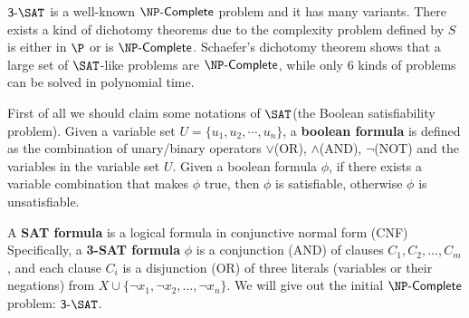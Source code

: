 
$\sat{3}$ is a well-known $\complete{\NP}$ problem and it has many variants. There exists a kind of dichotomy theorems due to the complexity problem defined by $S$ is either in $\P$ or is $\complete{\NP}$. Schaefer's dichotomy theorem shows that a large set of $\SAT$-like problems are $\complete{\NP}$, while only $6$ kinds of problems can be solved in polynomial time.

First of all we should claim some notations of $\SAT$(the Boolean satisfiability problem). Given a variable set $U = \{u_1,u_2,\cdots,u_n\}$, a \textbf{boolean formula} is defined as the combination of unary/binary operators $\vee$(OR), $\wedge$(AND), $\neg$(NOT) and the variables in the variable set $U$. Given a boolean formula $\phi$, if there exists a variable combination that makes $\phi$ true, then $\phi$ is satisfiable, otherwise $\phi$ is unsatisfiable.

A \textbf{SAT formula} is a logical formula in conjunctive normal form (CNF) Specifically, a \textbf{3-SAT formula} $\phi$ is a conjunction (AND) of clauses $C_1, C_2, \ldots, C_m$, and each clause $C_i$ is a disjunction (OR) of three literals (variables or their negations) from $X \cup \{\neg x_1, \neg x_2, \ldots, \neg x_n\}$. We will give out the initial $\complete{\NP}$ problem: $\sat{3}$.

